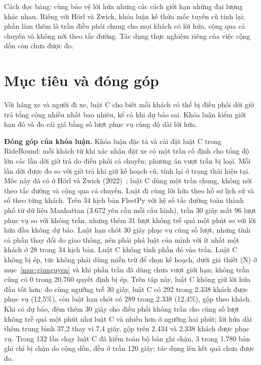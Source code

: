 Cách đọc bảng: cùng bảo vệ lời hứa nhưng các cách giới hạn những đại lượng khác nhau. Riêng với Hörl và Zwick,
khóa luận kế thừa mốc tuyến cũ tính lại; phần làm thêm là trần điều phối chung cho mọi khách có lời hứa, cộng
qua cả chuyến và không nới theo tắc đường. Tác dụng thực nghiệm riêng của việc cộng dồn còn chưa được đo.

\section{Mục tiêu và đóng góp}
\label{muc:c1-donggop}

Với hãng xe và người đi xe, luật C cho biết mỗi khách có thể bị điều phối dời giờ trả tổng cộng nhiều nhất
bao nhiêu, kể cả khi dự báo sai. Khóa luận kiểm giới hạn đó và đo cái giá bằng số lượt phục vụ cùng độ dài lời hứa.

\noindent\textbf{Đóng góp của khóa luận.}
Khóa luận đặc tả và cài đặt luật C trong RideBound: mỗi khách từ khi xác nhận đặt xe có một trần cố định
cho tổng độ lớn các lần dời giờ trả do điều phối cả chuyến; phương án vượt trần bị loại. Mỗi lần dời được đo so với giờ trả khi giữ kế hoạch cũ, tính lại ở trạng thái hiện tại. Mốc này đã có
ở Hörl và Zwick (2022)~\cite{horl2022}; luật C dùng một trần chung, không nới theo tắc đường và cộng qua cả chuyến.
Luật đi cùng lời hứa theo hồ sơ lịch sử và sổ theo từng khách. Trên 34 kịch bản FleetPy với hệ số tắc đường
toàn thành phố từ dữ liệu Manhattan (3.672 yêu cầu mỗi cấu hình), trần 30 giây mất 96 lượt phục vụ so với không
trần, nhưng thêm 31 lượt không trễ quá một phút so với lời hứa đầu không dự báo.
Luật hạn chót 30 giây phục vụ cùng số lượt, nhưng tính cả phần thay đổi do giao thông, nên phải phá luật của
mình với ít nhất một khách ở 28 trong 34 kịch bản. Luật C không tính phần đó vào trần. Luật C không bị ép, tức không phải dùng miễn trừ để chọn kế hoạch, dưới giả thiết (N) ở
mục~\ref{muc:giunguyen} và khi phần trần đã dùng chưa vượt giới hạn; không trần cũng có 0 trong 20.760 quyết
định bị ép. Trên tập này, luật C không giữ lời hứa đầu tốt hơn: đo cùng ngưỡng trễ
30 giây, luật C có 292 trong 2.338 khách được phục vụ (12,5\%), còn luật hạn chót có 289 trong 2.338 (12,4\%),
gộp theo khách. Khi có dự báo, đệm thêm 30 giây cho điều phối không trần cho cùng số lượt không trễ quá
một phút như luật C và nhiều hơn ở ngưỡng hai phút; lời hứa dài thêm trung bình 37,2 thay vì 7,4 giây,
gộp trên 2.434 và 2.338 khách được phục vụ. Trong 132 lần chạy luật C đã kiểm toàn bộ bản ghi chặn,
3 trong 1.780 bản ghi chỉ bị chặn do cộng dồn, đều ở trần 120 giây; tác dụng lên kết quả chưa được đo.

